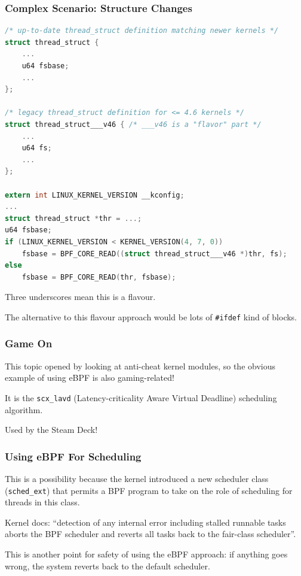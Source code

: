 \begin{frame}[fragile]
\frametitle{Complex Scenario: Structure Changes}

\begin{lstlisting}[language=C]
/* up-to-date thread_struct definition matching newer kernels */
struct thread_struct {
    ...
    u64 fsbase;
    ...
};

/* legacy thread_struct definition for <= 4.6 kernels */
struct thread_struct___v46 { /* ___v46 is a "flavor" part */
    ...
    u64 fs;
    ...
};

extern int LINUX_KERNEL_VERSION __kconfig;
...
struct thread_struct *thr = ...;
u64 fsbase;
if (LINUX_KERNEL_VERSION < KERNEL_VERSION(4, 7, 0))
    fsbase = BPF_CORE_READ((struct thread_struct___v46 *)thr, fs);
else
    fsbase = BPF_CORE_READ(thr, fsbase);
\end{lstlisting}

Three underscores mean this is a \alert{flavour}.

The alternative to this flavour approach would be lots of \texttt{\#ifdef} kind of blocks.

\end{frame}



\begin{frame}
\frametitle{Game On}

This topic opened by looking at anti-cheat kernel modules, so the obvious example of using eBPF is also gaming-related!

It is the \texttt{scx\_lavd} (Latency-criticality Aware Virtual Deadline) scheduling algorithm.

Used by the Steam Deck!

\end{frame}


\begin{frame}
\frametitle{Using eBPF For Scheduling}

This is a possibility because the kernel introduced a new scheduler class (\texttt{sched\_ext}) that permits a BPF program to take on the role of scheduling for threads in this class. 

Kernel docs: ``detection of any internal error including stalled runnable tasks aborts the BPF scheduler and reverts all tasks back to the fair-class scheduler''. 

This is another point for safety of using the eBPF approach: if anything goes wrong, the system reverts back to the default scheduler.

\end{frame}


